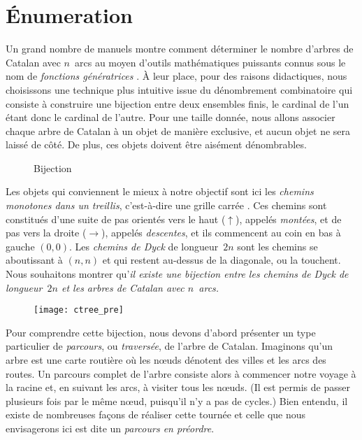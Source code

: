 \section{Énumeration}
\label{sec:Catalan_enumeration}

Un grand nombre de manuels \cite[\S~5.1
\&~5.2]{SedgewickFlajolet_1996} montre comment déterminer le nombre
d'arbres de Catalan avec \(n\)~arcs au moyen d'outils mathématiques
puissants connus sous le nom de \emph{fonctions génératrices}
\cite[chap.~7]{GrahamKnuthPatashnik_1994}. À leur place, pour des
raisons didactiques, nous choisissons une technique plus intuitive
issue du dénombrement combinatoire
qui consiste à construire une bijection entre deux ensembles finis, le
cardinal de l'un étant donc le cardinal de l'autre. Pour une taille
donnée, nous allons associer chaque arbre de Catalan à un objet de
manière exclusive, et aucun objet ne sera laissé de côté. De plus, ces
objets doivent être aisément dénombrables.

%
\begin{wrapfigure}[11]{r}[0pt]{0pt}
\centering
{}
\quad
{}
\caption{Bijection}
\label{fig:bijection}
\end{wrapfigure}
Les objets qui conviennent le mieux à notre objectif sont ici les
\emph{chemins monotones dans un treillis},  c'est-à-dire une grille carrée
\citep{Mohanty_1979,Humphreys_2010}. Ces chemins sont constitués d'une
suite de pas orientés vers le haut (\(\uparrow\)), appelés
\emph{montées}, et de pas vers la droite (\(\rightarrow\)), appelés
\emph{descentes}, et ils commencent au coin en bas à gauche
\((0,0)\). Les \emph{chemins de Dyck} de
longueur~\(2n\) sont les chemins se aboutissant à \((n,n)\) et qui
restent au-dessus de la diagonale, ou la touchent. Nous souhaitons
montrer qu'\emph{il existe une bijection entre les chemins de Dyck de
  longueur~\(2n\) et les arbres de Catalan avec \(n\)~arcs.}

\begin{wrapfigure}[7]{r}[0pt]{0pt}
\centering
\texttt{[image: ctree\_pre]}
\caption{}
\label{fig:ctree_pre}
\end{wrapfigure}
Pour comprendre cette bijection, nous devons d'abord présenter un type
particulier de \emph{parcours}, ou
\emph{traversée}, de l'arbre de
Catalan. Imaginons qu'un arbre est une carte routière où les nœuds
dénotent des villes et les arcs des routes. Un parcours complet de
l'arbre consiste alors à commencer notre voyage à la racine et, en
suivant les arcs, à visiter tous les nœuds. (Il est permis de
passer plusieurs fois par le même nœud, puisqu'il n'y a pas de
cycles.) Bien entendu, il existe de nombreuses façons de réaliser
cette tournée et celle que nous envisagerons ici est dite un
\emph{parcours en préordre}.

